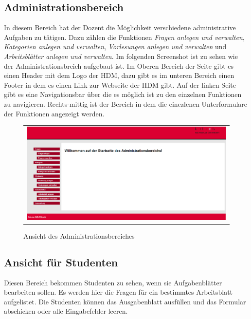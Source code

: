 \subsection{Administrationsbereich}
In diesem Bereich hat der Dozent die Möglichkeit verschiedene administrative
Aufgaben zu tätigen. Dazu zählen die Funktionen \emph{Fragen anlegen und
verwalten}, \emph{Kategorien anlegen und verwalten}, \emph{Vorlesungen anlegen
und verwalten} und \emph{Arbeitsblätter anlegen und verwalten}.
Im folgenden Screenshot ist zu sehen wie der Administrationsbreich aufgebaut
ist. Im Oberen Bereich der Seite gibt es einen Header mit dem Logo der \gls{HDM},
dazu gibt es im unteren Bereich einen Footer in dem es einen Link zur
Webseite der \gls{HDM} gibt. Auf der linken Seite gibt es eine Navigationsbar über
die es möglich ist zu den einzelnen Funktionen zu navigieren. Rechts-mittig ist
der Bereich in dem die einezlenen Unterformulare der Funktionen angezeigt
werden. 

\begin{figure} [!htb]
	\begin{center}
		  \begin{tabular}{@{}r@{}}
			{\includegraphics[width=36.6em]{images/Administrationsbereich.png}}\\
 	 	 \end{tabular}
		\caption{Ansicht des Administrationsbereiches}
		\label{fig:Administrationsbereich}
	\end{center} 
\end{figure}\FloatBarrier



\subsection{Ansicht für Studenten}
Diesen Bereich bekommen Studenten zu sehen, wenn sie Aufgabenblätter bearbeiten
sollen. Es werden hier die Fragen für ein bestimmtes Arbeitsblatt aufgelistet.
Die Studenten können das Ausgabenblatt ausfüllen und das Formular abschicken
oder alle Eingabefelder leeren.

